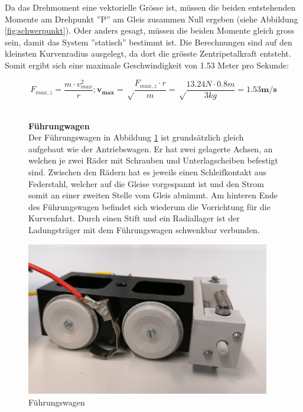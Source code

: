 \documentclass[../../main.tex]{subfiles}
\begin{document}
Da das Drehmoment eine vektorielle Grösse ist, müssen die beiden entstehenden Momente am Drehpunkt ''P'' am Gleis zusammen Null ergeben (siehe Abbildung \ref{fig:schwerpunkt}). Oder anders gesagt, müssen die beiden Momente gleich gross sein, damit das System ''statisch'' bestimmt ist. Die Berechnungen sind auf den kleinsten Kurvenradius ausgelegt, da dort die grösste Zentripetalkraft entsteht. Somit ergibt sich eine maximale Geschwindigkeit von 1.53 Meter pro Sekunde:

$$F_{max, z}=\frac{m \cdot v_{max}^2}{r};\boldsymbol{v_{max}}=\sqrt\frac{F_{max, z}\cdot r}{m}=\sqrt\frac{13.24N \cdot 0.8m}{3kg}=\boldsymbol{1.53m/s}$$\\

\begin{figure}[H]
  \begin{minipage}{.5\textwidth}
    \textbf{Führungwagen}\\
    Der Führungswagen in Abbildung \ref{fig:fuehrungswagen1} ist grundsätzlich gleich aufgebaut wie der Antriebswagen. Er hat zwei gelagerte Achsen, an welchen je zwei Räder mit Schrauben und Unterlagscheiben befestigt sind. Zwischen den Rädern hat es jeweils einen Schleifkontakt aus Federstahl, welcher auf die Gleise vorgespannt ist und den Strom somit an einer zweiten Stelle vom Gleis abnimmt. Am hinteren Ende des Führungswagen befindet sich wiederum die Vorrichtung für die Kurvenfahrt. Durch einen Stift und ein Radiallager ist der Ladungsträger mit dem Führungswagen schwenkbar verbunden.
   \end{minipage}
  \begin{minipage}{.5\textwidth}
    \flushright
    \includegraphics[width=0.95\textwidth]{fuehrungswagen2.JPG}
    \caption {Führungswagen}
    \label{fig:fuehrungswagen1}
    \end{minipage}
\end{figure}
\end{document}
